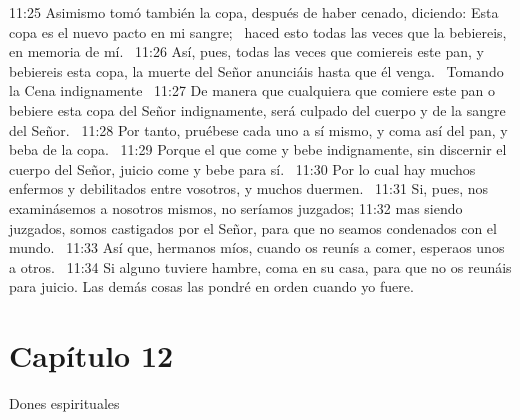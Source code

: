 11:25 Asimismo tomó también la copa, después de haber cenado, diciendo: Esta copa es el nuevo pacto en mi sangre;  haced esto todas las veces que la bebiereis, en memoria de mí.  
11:26 Así, pues, todas las veces que comiereis este pan, y bebiereis esta copa, la muerte del Señor anunciáis hasta que él venga.  
Tomando la Cena indignamente  
11:27 De manera que cualquiera que comiere este pan o bebiere esta copa del Señor indignamente, será culpado del cuerpo y de la sangre del Señor.  
11:28 Por tanto, pruébese cada uno a sí mismo, y coma así del pan, y beba de la copa.  
11:29 Porque el que come y bebe indignamente, sin discernir el cuerpo del Señor, juicio come y bebe para sí.  
11:30 Por lo cual hay muchos enfermos y debilitados entre vosotros, y muchos duermen.  
11:31 Si, pues, nos examinásemos a nosotros mismos, no seríamos juzgados; 
11:32 mas siendo juzgados, somos castigados por el Señor, para que no seamos condenados con el mundo.  
11:33 Así que, hermanos míos, cuando os reunís a comer, esperaos unos a otros.  
11:34 Si alguno tuviere hambre, coma en su casa, para que no os reunáis para juicio. Las demás cosas las pondré en orden cuando yo fuere.  
\section*{Capítulo 12}
Dones espirituales  

